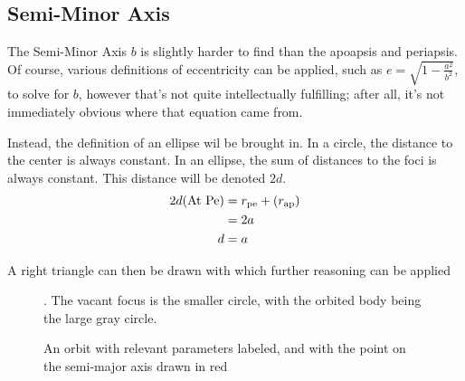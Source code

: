 \documentclass[../basicOrbitalDynamics.tex]{subfiles}
\begin{document}
\subsection{Semi-Minor Axis}\label{Sec:Semi Minor Axis Geometric}

The Semi-Minor Axis $b$ is slightly harder to find than the apoapsis and periapsis. Of course, various definitions of eccentricity can be applied, such as $e=\sqrt{1-\frac{a^2}{b^2}}$, to solve for $b$, however that's not quite intellectually fulfilling; after all, it's not immediately obvious where that equation came from.

Instead, the definition of an ellipse wil be brought in. In a circle, the distance to the center is always constant. In an ellipse, the sum of distances to the foci is always constant. This distance will be denoted $2d$.
\begin{align*}
    2d(\text{At Pe}) & = {r}_\text{pe}+({r}_\text{ap}) \\
                     & = 2a                        \\
    d                & =a
\end{align*}

A right triangle can then be drawn with which further reasoning can be applied
\begin{figure}[H]
    \centering

    \caption{An orbit with relevant parameters labeled, and with the point on the semi-major axis drawn in red}. The vacant focus is the smaller circle, with the orbited body being the large gray circle.
\end{figure}
\end{document}
